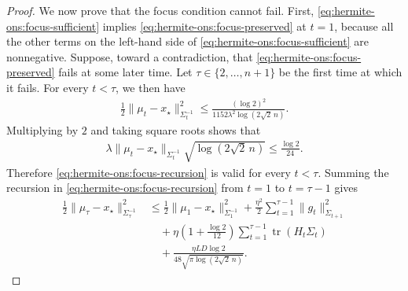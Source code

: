 \documentclass{article}
\theoremstyle{plain}
\theoremstyle{definition}
\theoremstyle{plain}
\newcommand{\tr}{\operatorname{tr}}
\begin{document}
\begin{proof}
    We now prove that the focus condition cannot fail. First,
    \eqref{eq:hermite-ons:focus-sufficient} implies
    \eqref{eq:hermite-ons:focus-preserved} at $t=1$, because all the
    other terms on the left-hand side of
    \eqref{eq:hermite-ons:focus-sufficient} are nonnegative.
    Suppose, toward a contradiction, that
    \eqref{eq:hermite-ons:focus-preserved} fails at some later time.
    Let $\tau\in\{2,\ldots,n+1\}$ be the first time at which it fails.
    For every $t<\tau$, we then have
    \begin{align}
        \frac12
        \|\mu_t-x_\star\|_{\Sigma_t^{-1}}^2
        \leq
        \frac{(\log2)^2}
        {1152\lambda^2\log(2\sqrt2\,n)}.
    \end{align}
    Multiplying by $2$ and taking square roots shows that
    \begin{align}
        \lambda
        \|\mu_t-x_\star\|_{\Sigma_t^{-1}}
        \sqrt{\log(2\sqrt2\,n)}
        \leq
        \frac{\log2}{24}.
    \end{align}
    Therefore \eqref{eq:hermite-ons:focus-recursion} is valid for every
    $t<\tau$.
    Summing the recursion in \eqref{eq:hermite-ons:focus-recursion} from $t=1$ to $t=\tau-1$
    gives
    \begin{align}
        \frac12
        \|\mu_\tau-x_\star\|_{\Sigma_\tau^{-1}}^2
         & \leq
        \frac12
        \|\mu_1-x_\star\|_{\Sigma_1^{-1}}^2
        +
        \frac{\eta^2}{2}
        \sum_{t=1}^{\tau-1}
        \|g_t\|_{\Sigma_{t+1}}^2
        \nonumber \\
         & \quad+
        \eta\left(1+\frac{\log2}{12}\right)
        \sum_{t=1}^{\tau-1}
        \tr(H_t\Sigma_t)
        \nonumber \\
         & \quad+
        \frac{\eta LD\log2}
        {48\sqrt{\pi\log(2\sqrt2\,n)}}.
        \label{eq:hermite-ons:focus-summed}
    \end{align}


\end{proof}
\end{document}
